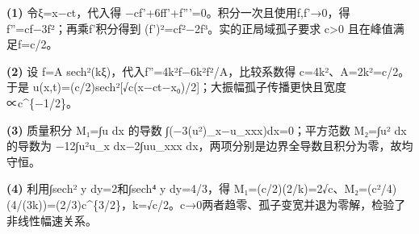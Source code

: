 \par\noindent\textbf{(1)} 令ξ=x−ct，代入得 −cf'+6ff'+f'''=0。积分一次且使用f,f'→0，得 f''=cf−3f²；再乘f'积分得到 (f')²=cf²−2f³。实的正局域孤子要求 c>0 且在峰值满足f=c/2。
\par\noindent\textbf{(2)} 设 f=A sech²(kξ)，代入f''=4k²f−6k²f²/A，比较系数得 c=4k²、A=2k²=c/2。于是 u(x,t)=(c/2)sech²[√c(x−ct−x₀)/2]；大振幅孤子传播更快且宽度∝c\textasciicircum{}\{−1/2\}。
\par\noindent\textbf{(3)} 质量积分 M₁=∫u dx 的导数 ∫(−3(u²)\_x−u\_xxx)dx=0；平方范数 M₂=∫u² dx 的导数为 −12∫u²u\_x dx−2∫uu\_xxx dx，两项分别是边界全导数且积分为零，故均守恒。
\par\noindent\textbf{(4)} 利用∫sech² y dy=2和∫sech⁴ y dy=4/3，得 M₁=(c/2)(2/k)=2√c、M₂=(c²/4)(4/(3k))=(2/3)c\textasciicircum{}\{3/2\}，k=√c/2。c→0两者趋零、孤子变宽并退为零解，检验了非线性幅速关系。
